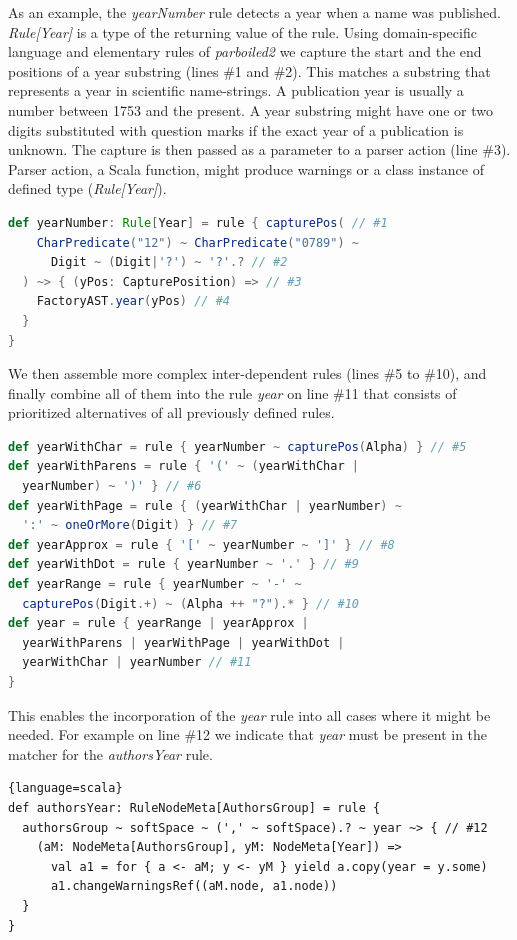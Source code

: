 \documentclass{bmcart}
\begin{document}
As an example, the \textit{yearNumber} rule detects a year when a name was published. \textit{Rule[Year]} is a type of the returning value of the rule. Using domain-specific language and elementary rules of \textit{parboiled2} we capture the start and the end positions of a year substring (lines \#1 and \#2). This matches a substring that represents a year in scientific name-strings. A publication year is usually a number between 1753 \cite{Linne1753} and the present. A year substring might have one or two digits substituted with question marks if the exact year of a publication is unknown. The capture is then passed as a parameter to a parser action (line \#3). Parser action,  a Scala function, might produce warnings or a class instance of defined type (\textit{Rule[Year]}).

\begin{lstlisting}[language=scala]
def yearNumber: Rule[Year] = rule { capturePos( // #1
    CharPredicate("12") ~ CharPredicate("0789") ~
      Digit ~ (Digit|'?') ~ '?'.? // #2
  ) ~> { (yPos: CapturePosition) => // #3
    FactoryAST.year(yPos) // #4
  }
}
\end{lstlisting}

We then assemble more complex inter-dependent rules (lines \#5 to \#10), and finally combine all of them into the rule \textit{year} on line \#11 that consists of prioritized alternatives of all previously defined rules.

\begin{lstlisting}[language=scala]
def yearWithChar = rule { yearNumber ~ capturePos(Alpha) } // #5
def yearWithParens = rule { '(' ~ (yearWithChar |
  yearNumber) ~ ')' } // #6
def yearWithPage = rule { (yearWithChar | yearNumber) ~
  ':' ~ oneOrMore(Digit) } // #7
def yearApprox = rule { '[' ~ yearNumber ~ ']' } // #8
def yearWithDot = rule { yearNumber ~ '.' } // #9
def yearRange = rule { yearNumber ~ '-' ~
  capturePos(Digit.+) ~ (Alpha ++ "?").* } // #10
def year = rule { yearRange | yearApprox |
  yearWithParens | yearWithPage | yearWithDot |
  yearWithChar | yearNumber // #11
}
\end{lstlisting}

This enables the incorporation of the \textit{year} rule into all cases where it might be needed. For example on line \#12 we indicate that \textit{year} must be present in the matcher for the \textit{authorsYear} rule.

\begin{lstlisting}{language=scala}
def authorsYear: RuleNodeMeta[AuthorsGroup] = rule {
  authorsGroup ~ softSpace ~ (',' ~ softSpace).? ~ year ~> { // #12
    (aM: NodeMeta[AuthorsGroup], yM: NodeMeta[Year]) =>
      val a1 = for { a <- aM; y <- yM } yield a.copy(year = y.some)
      a1.changeWarningsRef((aM.node, a1.node))
  }
}
\end{lstlisting}
\end{document}
